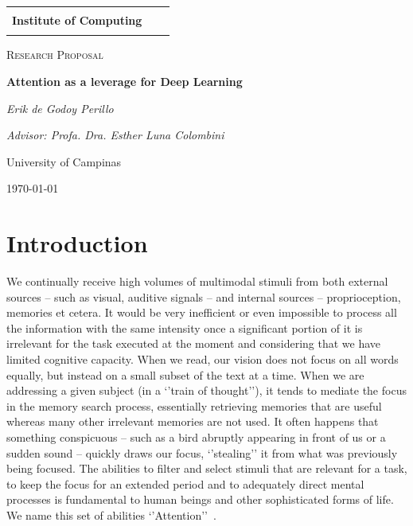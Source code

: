 \documentclass[12pt]{article}
\makeatletter
\def\logos{
  \noindent
  \begin{center}
  \begin{tabular}{ccc}
    \raisebox{-.5\height}{\LogoUnicamp}
    &
    \begin{minipage}{.6\textwidth}
      \centering
      \textbf{\@UNICAMP} \\
      \textbf{Institute of Computing} \\
    \end{minipage}
    &
    \raisebox{-.45\height}{\scalebox{1.11}{\LogoIcUnicampWithName}}
  \end{tabular}
  \end{center}
}
\makeatother
\begin{document}

\begin{titlepage}
    \logos
	\centering
	{\scshape\Large Research Proposal\par}
	\vspace{1.5cm}
	{\huge\bfseries Attention as a leverage for Deep Learning\par}
	\vspace{1cm}
	{\itshape Erik de Godoy Perillo\par}
	{\itshape Advisor: Profa. Dra. Esther Luna Colombini\par}
	\vspace{0.5cm}
	\begin{abstract}
        Attention is fundamental for intelligent beings.
        It is necessary for filtering the significant volumes of stimuli we constantly receive
        and for applying the adequate mental resources to perform tasks.
        Deep Learning is currently broadly applied to Artificial Intelligence.
        The use of Attention in Deep Learning has been increasingly frequent,
        resulting many times in better results.
        In this context, this work proposes the study and elaboration of approaches
        to use Attention in Deep Learning
        for more power and efficiency to solve problems in Artificial Intelligence.
        We aim at obtaining a framework generically applicable in broad problem classes
        such as Computer Vision, Natural Language Processing, Program Composition and others.
	\end{abstract}
	\vfill
	University of Campinas
	\vfill
	{\large \today\par}
\end{titlepage}

\newpage

\section{Introduction}
We continually receive high volumes of multimodal stimuli from both external sources
-- such as visual, auditive signals -- and internal sources -- proprioception, memories et cetera.
It would be very inefficient or even impossible to process all the information with
the same intensity once a significant portion of it is irrelevant for
the task executed at the moment and considering that we have limited cognitive capacity.
When we read, our vision does not focus on all
words equally, but instead on a small subset of the text at a time.
When we are addressing a given subject (in a `'train of thought''), it tends to mediate the focus
in the memory search process, essentially retrieving memories that
are useful whereas many other irrelevant memories are not used.
It often happens that something conspicuous
-- such as a bird abruptly appearing in front of us or a sudden sound --
quickly draws our focus, `'stealing'' it from what was previously being focused.
The abilities to filter and select stimuli that are relevant for a task, to keep the focus for an
extended period and to adequately direct mental processes is fundamental to
human beings and other sophisticated forms of life.
We name this set of abilities `'Attention''~\cite{ref:esther-thesis}.
\end{document}
